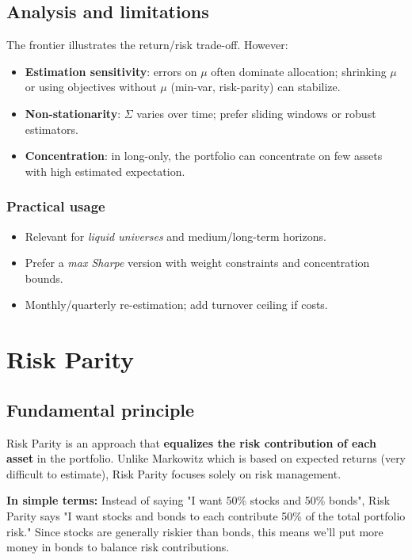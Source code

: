 \documentclass[11pt,a4paper]{article}
\begin{document}
\subsection{Analysis and limitations}
The frontier illustrates the return/risk trade-off. However:
\begin{itemize}
  \item \textbf{Estimation sensitivity}: errors on \(\mu\) often dominate allocation; shrinking \(\mu\) or using objectives without \(\mu\) (min-var, risk-parity) can stabilize.
  \item \textbf{Non-stationarity}: \(\Sigma\) varies over time; prefer sliding windows or robust estimators.
  \item \textbf{Concentration}: in long-only, the portfolio can concentrate on few assets with high estimated expectation.
\end{itemize}

\subsubsection*{Practical usage}
\begin{itemize}
  \item Relevant for \emph{liquid universes} and medium/long-term horizons.
  \item Prefer a \emph{max Sharpe} version with weight constraints and concentration bounds.
  \item Monthly/quarterly re-estimation; add turnover ceiling if costs.
\end{itemize}

\FloatBarrier
\section{Risk Parity}

\subsection{Fundamental principle}
Risk Parity is an approach that \textbf{equalizes the risk contribution of each asset} in the portfolio. Unlike Markowitz which is based on expected returns (very difficult to estimate), Risk Parity focuses solely on risk management.

\textbf{In simple terms:} Instead of saying "I want 50\% stocks and 50\% bonds", Risk Parity says "I want stocks and bonds to each contribute 50\% of the total portfolio risk." Since stocks are generally riskier than bonds, this means we'll put more money in bonds to balance risk contributions.
\end{document}
